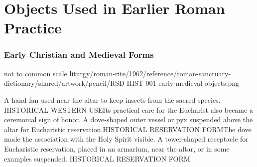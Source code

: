 \part{Objects Used in Earlier Roman Practice}

\begin{center}
\end{center}

\section{Early Christian and Medieval Forms}
  {not to common scale}
\DictionaryGraphic{3.55in}
  {liturgy/roman-rite/1962/reference/roman-sanctuary-dictionary/shared/artwork/pencil/RSD-HIST-001-early-medieval-objects.png}

\DictionaryThreeCellRow
{
  {}{A hand fan used near the altar to keep insects from the sacred species.}
  {HISTORICAL WESTERN USE}{Its practical care for the Eucharist also became a
  ceremonial sign of honor.}}
{
  {}{A dove-shaped outer vessel or pyx suspended above the altar for
  Eucharistic reservation.}{HISTORICAL RESERVATION FORM}{The dove made the
  association with the Holy Spirit visible.}}
{
  {}{A tower-shaped receptacle for Eucharistic reservation, placed in an
  armarium, near the altar, or in some examples suspended.}
  {HISTORICAL RESERVATION FORM}{}}

